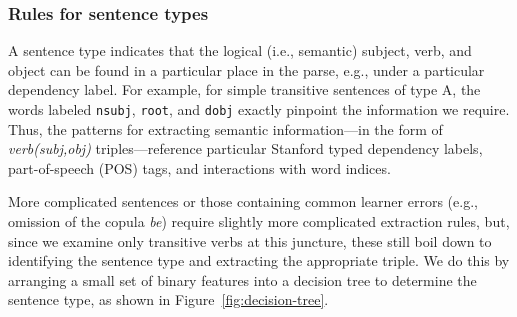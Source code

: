 \subsubsection{Rules for sentence types}


A sentence type indicates that the logical (i.e., semantic) subject,
verb, and object can be found in a particular place in the parse,
e.g., under a particular dependency label.
For example, for simple transitive sentences of type A,
the words labeled {\tt nsubj}, {\tt root}, and {\tt dobj} exactly
pinpoint the information we require.
Thus, the patterns for extracting semantic information---in the form
of \textit{verb(subj,obj)} triples---reference particular Stanford
typed dependency labels, part-of-speech (POS) tags, and interactions
with word indices.

More complicated sentences or those containing common learner errors
(e.g., omission of the copula \textit{be}) require slightly more
complicated extraction rules, but, since we examine only transitive
verbs at this juncture, these still boil down to identifying the
sentence type and extracting the appropriate triple.  We do this by
arranging a small set of binary features into a decision tree to
determine the sentence type, as shown in
Figure~\ref{fig:decision-tree}.


